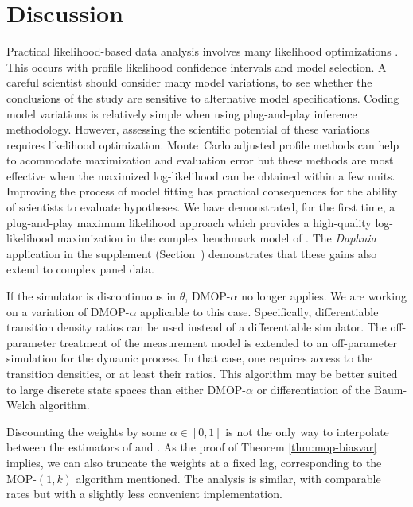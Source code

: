 \documentclass[numsec,webpdf,modern,medium,namedate]{oup-authoring-template}
\begin{document}
\section{Discussion}

Practical likelihood-based data analysis involves many likelihood optimizations \citep{king08,blake14,pons-salort18,subramanian21,fox22,drake23}.
This occurs with profile likelihood confidence intervals and model selection. A careful scientist should consider many model variations, to see whether the conclusions of the study are sensitive to alternative model specifications.
Coding model variations is relatively simple when using plug-and-play inference methodology.
However, assessing the scientific potential of these variations requires likelihood optimization.
Monte~Carlo adjusted profile methods can help to acommodate maximization and evaluation error \citep{ionides17,ning21} but these methods are most effective when the maximized log-likelihood can be obtained within a few units.
Improving the process of model fitting has practical consequences for the ability of scientists to evaluate hypotheses.
We have demonstrated, for the first time, a plug-and-play maximum likelihood approach which provides a high-quality log-likelihood maximization in the complex benchmark model of \cite{king08}.
The \textit{Daphnia} application in the supplement (Section~\suppSecDaphnia) demonstrates that these gains also extend to complex panel data.


If the simulator is discontinuous in $\theta$, DMOP-$\alpha$ no longer applies.
We are working on a variation of DMOP-$\alpha$ applicable to this case.
Specifically, differentiable transition density ratios can be used instead of a differentiable simulator.
The off-parameter treatment of the measurement model is extended to an off-parameter simulation for the dynamic process.
In that case, one requires access to the transition densities, or at least their ratios. 
This algorithm may be better suited to large discrete state spaces than either DMOP-$\alpha$ or differentiation of the Baum-Welch algorithm.

Discounting the weights by some $\alpha \in [0,1]$ is not the only way to interpolate between the estimators of \cite{naesseth18} and \cite{poyiadjis11}. 
As the proof of Theorem \ref{thm:mop-biasvar} implies, we can also truncate the weights at a fixed lag, corresponding to the MOP-$(1,k)$ algorithm mentioned. 
The analysis is similar, with comparable rates but with a slightly less convenient implementation. 
\end{document}
